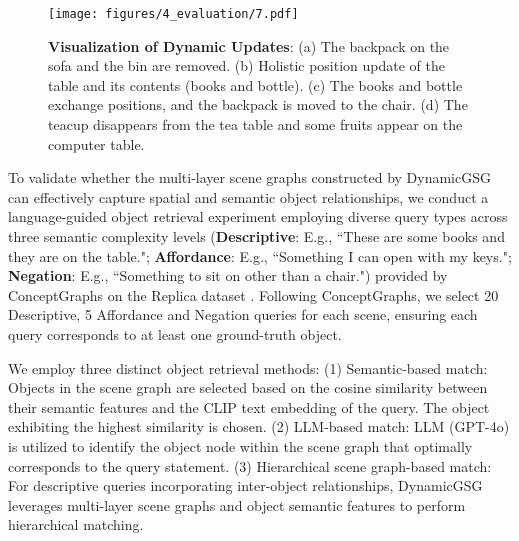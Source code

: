 \begin{figure*}[!t]
  \centering
  \texttt{[image: figures/4\_evaluation/7.pdf]}
  \caption{\textbf{Visualization of Dynamic Updates}: (a) The backpack on the sofa and the bin are removed. (b) Holistic position update of the table and its contents (books and bottle). (c) The books and bottle exchange positions, and the backpack is moved to the chair. (d) The teacup disappears from the tea table and some fruits appear on the computer table.}
  \label{fig:dynamic}
\end{figure*}

To validate whether the multi-layer scene graphs constructed by DynamicGSG can effectively capture spatial and semantic object relationships, we conduct a language-guided object retrieval experiment employing diverse query types across three semantic complexity levels (\textbf{Descriptive}: E.g., ``These are some books and they are on the table."; \textbf{Affordance}: E.g., ``Something I can open with my keys."; \textbf{Negation}: E.g., ``Something to sit on other than a chair.") provided by ConceptGraphs \cite{gu2023conceptgraphsopenvocabulary3dscene} on the Replica dataset \cite{replica19arxiv}. Following ConceptGraphs, we select 20 Descriptive, 5 Affordance and Negation queries for each scene, ensuring each query corresponds to at least one ground-truth object.

We employ three distinct object retrieval methods: (1) Semantic-based match: Objects in the scene graph are selected based on the cosine similarity between their semantic features and the CLIP text embedding of the query. The object exhibiting the highest similarity is chosen. (2) LLM-based match: LLM (GPT-4o) is utilized to identify the object node within the scene graph that optimally corresponds to the query statement. (3) Hierarchical scene graph-based match: For descriptive queries incorporating inter-object relationships, DynamicGSG leverages multi-layer scene graphs and object semantic features to perform hierarchical matching.


